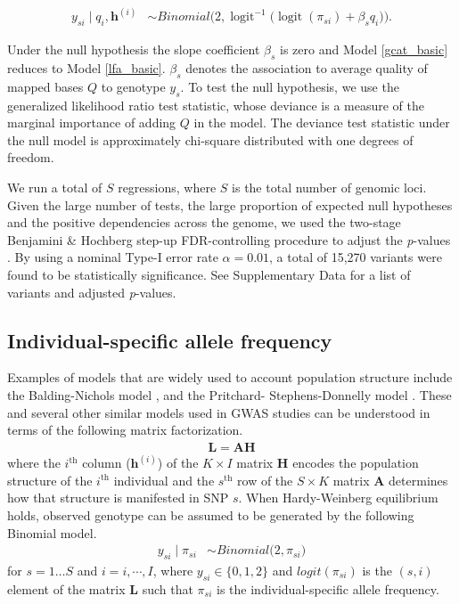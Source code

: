 \documentclass[9pt,lineno]{template}
\newcommand{\logit}{\operatorname{logit}}
\begin{document}
\begin{align}\label{gcat_basic}
 y_{si} \mid q_i, \boldsymbol{h}^{(i)} &\sim Binomial\bigg( 2, \logit^{-1}\Big(\logit(\pi_{si}) + \beta_s q_i\Big) \bigg).
\end{align} 

Under the null hypothesis the slope coefficient $\beta_s$ is zero and Model \eqref{gcat_basic} reduces to Model \eqref{lfa_basic}. 
$\beta_s$ denotes the association to average quality of mapped bases $Q$ to genotype $y_{s}$. 
To test the null hypothesis, we use the generalized likelihood ratio test statistic, whose deviance is a measure of the marginal importance of adding $Q$ in the model. 
The deviance test statistic under the null model is approximately chi-square distributed with one degrees of freedom.

We run a total of $S$ regressions, where $S$ is the total number of genomic loci. Given the large number of tests, the large proportion of expected null hypotheses and the positive dependencies across the genome, we used the two-stage Benjamini \& Hochberg step-up FDR-controlling procedure to adjust the \textit{p}-values \citep{Benjamini2006}.
By using a nominal Type-I error rate $\alpha = 0.01$, a total of 15,270 variants were found to be statistically significance. 
See Supplementary Data for a list of variants and adjusted \textit{p}-values.

\subsection{Individual-specific allele frequency}
Examples of models that are widely used to account population structure include the Balding-Nichols model \citep{balding1995method}, and the Pritchard- Stephens-Donnelly model \citep{pritchard2000inference}. 
These and several other similar models used in GWAS studies can be understood in terms of the following matrix factorization. 
\begin{align}
\mathbf{L }= \mathbf{AH}
\end{align} 
where the $i^\text{th}$ column ($\boldsymbol{h}^{(i)}$) of the $K \times I$ matrix $\mathbf{H}$ encodes the population structure of the $i^\text{th}$ individual and the $s^\text{th}$ row of the $S \times K$ matrix $\mathbf{A}$ determines how that structure is manifested in SNP $s$. 
When Hardy-Weinberg equilibrium holds, observed genotype can be assumed to be generated by the following Binomial model.
\begin{align} \label{lfa}
y_{si} \mid \pi_{si}  &\sim Binomial\big( 2, \pi_{si} \big) 
\end{align} 
for $s=1\hdots S$ and $i=i,\cdots, I$, where $y_{si} \in \{0,1,2\}$ and $logit(\pi_{si})$ is the $(s,i)$ element of the matrix $\mathbf{L}$ such that  $\pi_{si}$ is the individual-specific allele frequency.
\end{document}
